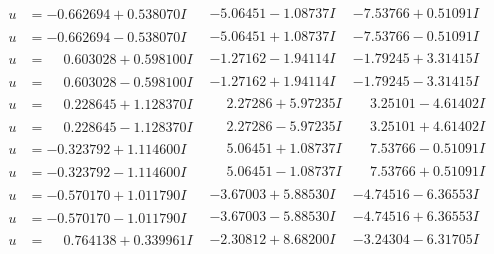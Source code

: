\documentclass[1p]{elsarticle_modified}
\theoremstyle{definition}
\begin{document}
$$\begin{array}{c|c|c}
\begin{aligned}
u &= -0.662694 + 0.538070 I\end{aligned}
 & -5.06451 - 1.08737 I & -7.53766 + 0.51091 I \\ \hline\begin{aligned}
u &= -0.662694 - 0.538070 I\end{aligned}
 & -5.06451 + 1.08737 I & -7.53766 - 0.51091 I \\ \hline\begin{aligned}
u &= \phantom{-}0.603028 + 0.598100 I\end{aligned}
 & -1.27162 - 1.94114 I & -1.79245 + 3.31415 I \\ \hline\begin{aligned}
u &= \phantom{-}0.603028 - 0.598100 I\end{aligned}
 & -1.27162 + 1.94114 I & -1.79245 - 3.31415 I \\ \hline\begin{aligned}
u &= \phantom{-}0.228645 + 1.128370 I\end{aligned}
 & \phantom{-}2.27286 + 5.97235 I & \phantom{-}3.25101 - 4.61402 I \\ \hline\begin{aligned}
u &= \phantom{-}0.228645 - 1.128370 I\end{aligned}
 & \phantom{-}2.27286 - 5.97235 I & \phantom{-}3.25101 + 4.61402 I \\ \hline\begin{aligned}
u &= -0.323792 + 1.114600 I\end{aligned}
 & \phantom{-}5.06451 + 1.08737 I & \phantom{-}7.53766 - 0.51091 I \\ \hline\begin{aligned}
u &= -0.323792 - 1.114600 I\end{aligned}
 & \phantom{-}5.06451 - 1.08737 I & \phantom{-}7.53766 + 0.51091 I \\ \hline\begin{aligned}
u &= -0.570170 + 1.011790 I\end{aligned}
 & -3.67003 + 5.88530 I & -4.74516 - 6.36553 I \\ \hline\begin{aligned}
u &= -0.570170 - 1.011790 I\end{aligned}
 & -3.67003 - 5.88530 I & -4.74516 + 6.36553 I \\ \hline\begin{aligned}
u &= \phantom{-}0.764138 + 0.339961 I\end{aligned}
 & -2.30812 + 8.68200 I & -3.24304 - 6.31705 I \\ \hline\begin{aligned}

\end{aligned}
\end{array}$$
\end{document}
